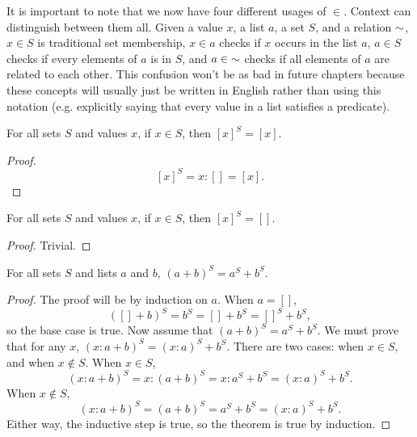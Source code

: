 \documentclass[../../math.tex]{subfiles}
\begin{document}
It is important to note that we now have four different usages of $\in$.
Context can distinguish between them all.  Given a value $x$, a list $a$, a set
$S$, and a relation ${\sim}$, $x \in S$ is traditional set membership, $x \in a$
checks if $x$ occurs in the list $a$, $a \in S$ checks if every elements of $a$
is in $S$, and $a \in {\sim}$ checks if all elements of $a$ are related to each
other.  This confusion won't be as bad in future chapters because these concepts
will usually just be written in English rather than using this notation (e.g.
explicitly saying that every value in a list satisfies a predicate).

\begin{theorem}
    For all sets $S$ and values $x$, if $x \in S$, then $[x]^S = [x]$.
\end{theorem}
\begin{proof}
    \[
        [x]^S = x : [] = [x].
    \]
\end{proof}

\begin{theorem}
    For all sets $S$ and values $x$, if $x \in S$, then $[x]^S = []$.
\end{theorem}
\begin{proof}
    Trivial.
\end{proof}

\begin{theorem}
    For all sets $S$ and lists $a$ and $b$, $(a + b)^S = a^S + b^S$.
\end{theorem}
\begin{proof}
    The proof will be by induction on $a$.  When $a = []$,
    \[
        ([] + b)^S = b^S = [] + b^S = []^S + b^S,
    \]
    so the base case is true.  Now assume that $(a + b)^S = a^S + b^S$.  We must
    prove that for any $x$, $(x : a + b)^S = (x : a)^S + b^S$.  There are two
    cases: when $x \in S$, and when $x \notin S$.  When $x \in S$,
    \[
        (x : a + b)^S = x : (a + b)^S = x : a^S + b^S = (x : a)^S + b^S.
    \]
    When $x \notin S$,
    \[
        (x : a + b)^S = (a + b)^S = a^S + b^S = (x : a)^S + b^S.
    \]
    Either way, the inductive step is true, so the theorem is true by induction.
\end{proof}
\end{document}
